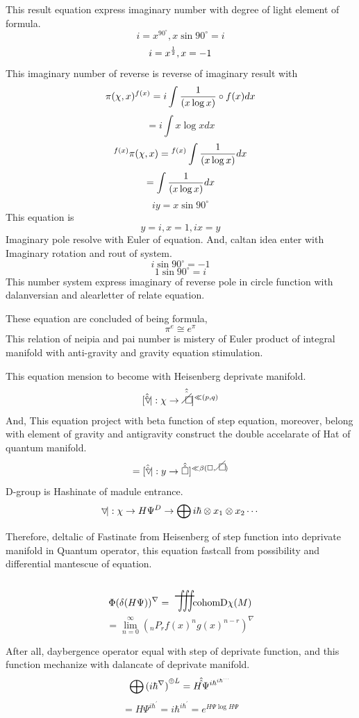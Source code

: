 \documentclass{jsarticle}
\begin{document}
    This result equation express imaginary number with degree
    of light element of formula.
    $$ i = x^{90^{\circ}}, x\sin 90^{\circ} = i$$
    $$ i = x^{1 \over 2},x= -1 $$
    This imaginary number of reverse is reverse of imaginary result with
    $$ \pi(\chi,x)^{f(x)} = i \int{1 \over {(x\log x)}}\circ f(x)dx $$
    $$ = i \int x \log x dx $$
    $$ {}^{f(x)}\pi(\chi,x) = {}^{f(x)}\int{1 \over {(x\log x)}}dx $$
    $$ = \int {1 \over {(x\log x)}}dx $$
    $$ iy = x\sin 90^{\circ} $$
    This equation is 
    $$ y = i, x = 1, ix = y $$
    Imaginary pole resolve with Euler of equation. And, caltan idea enter
    with Imaginary rotation and rout of system.
    $$ i \sin 90^{\circ} = -1 $$
    $$ 1 \sin 90^{\circ} = i $$
    This number system express imaginary of reverse pole in circle function
    with dalanversian and alearletter of relate equation.
    
    These equation are concluded of being formula,
    $$ \pi^{e} \cong e^{\pi} $$
    This relation of neipia and pai number is mistery of Euler product 
    of integral manifold with anti-gravity and gravity equation stimulation.



    This equation mension to become with Heisenberg deprivate manifold.
    $$ [\Hat{\Hat{\varve}} |: \chi \to \Hat{\Hat{\alearletter}}]{}^{\ll
    {(p,q)}} $$
    And, This equation project with beta function of step equation,
    moreover, belong with element of gravity and antigravity 
    construct the double accelarate of Hat of quantum manifold.
    $$ = [\Hat{\Hat{\varve}} |: y \to \Hat{\Hat{\square}}]^{\ll \beta(
    \square, \alearletter)} $$
    D-group is Hashinate of madule entrance.
    $$ \varve |: \chi \to H\Psi^{D} \to \bigoplus {i\hbar} \otimes x_1
    \otimes x_2 \cdots $$

    Therefore, deltalic of Fastinate from Heisenberg of step function
    into deprivate manifold in Quantum operator, this equation fastcall from
    possibility and differential mantescue of equation.
  $$ \Phi(\delta(H\Psi))^{\nabla} = \scalebox{1}[2]{\variiint} \mathrm{cohom D\chi}(M) $$
  $$ = \lim_{n=0}^{\infty}({}_n P_{r} f(x)^{n} g(x)^{n-r})^{\nabla} $$

  After all, daybergence operator equal with step of deprivate function,
  and this function mechanize with dalancate of deprivate manifold.
  $$ \bigoplus{(i\hbar^{\nabla})}^{\oplus L} = {\Hat{\Hat{H\Psi}}^
  {i\hbar^{{i\hbar}^{\cdots}}}} $$
  $$ = H\Psi^{i\hbar^{'}} = i\hbar^{i\hbar^{'}} = e^{H\Psi\log H\Psi} $$
\end{document}
